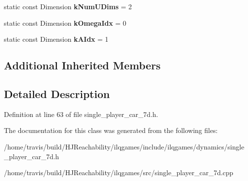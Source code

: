 \begin{DoxyCompactItemize}
\item 
static const Dimension {\bfseries k\+Num\+U\+Dims} = 2\hypertarget{classilqgames_1_1_single_player_car7_d_a82513dac7d45b3881512cf06b8abda84}{}\label{classilqgames_1_1_single_player_car7_d_a82513dac7d45b3881512cf06b8abda84}

\item 
static const Dimension {\bfseries k\+Omega\+Idx} = 0\hypertarget{classilqgames_1_1_single_player_car7_d_a0a795d59a3fd1e741ebc6c5bbc092ac9}{}\label{classilqgames_1_1_single_player_car7_d_a0a795d59a3fd1e741ebc6c5bbc092ac9}

\item 
static const Dimension {\bfseries k\+A\+Idx} = 1\hypertarget{classilqgames_1_1_single_player_car7_d_a93cc9c23a5f4c18ddd397a5fe29060af}{}\label{classilqgames_1_1_single_player_car7_d_a93cc9c23a5f4c18ddd397a5fe29060af}

\end{DoxyCompactItemize}
\subsection*{Additional Inherited Members}


\subsection{Detailed Description}


Definition at line 63 of file single\+\_\+player\+\_\+car\+\_\+7d.\+h.



The documentation for this class was generated from the following files\+:\begin{DoxyCompactItemize}
\item 
/home/travis/build/\+H\+J\+Reachability/ilqgames/include/ilqgames/dynamics/single\+\_\+player\+\_\+car\+\_\+7d.\+h\item 
/home/travis/build/\+H\+J\+Reachability/ilqgames/src/single\+\_\+player\+\_\+car\+\_\+7d.\+cpp\end{DoxyCompactItemize}
